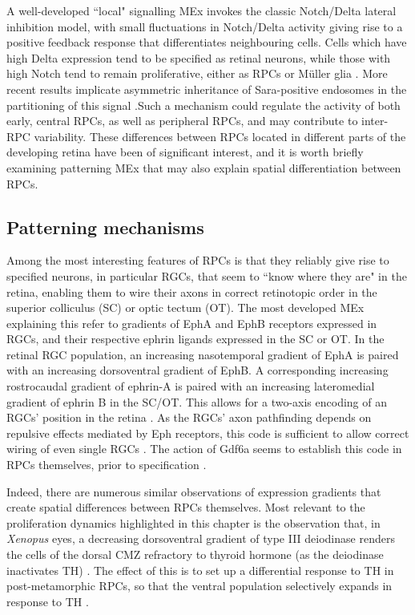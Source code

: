 A well-developed ``local" signalling MEx invokes the classic Notch/Delta lateral inhibition model, with small fluctuations in Notch/Delta activity giving rise to a positive feedback response that differentiates neighbouring cells. Cells which have high Delta expression tend to be specified as retinal neurons, while those with high Notch tend to remain proliferative, either as RPCs or M{\"u}ller glia \cite{Dorsky1995,Dorsky1997}. More recent results implicate asymmetric inheritance of Sara-positive endosomes in the partitioning of this signal \cite{Nerli2020}.Such a mechanism could regulate the activity of both early, central RPCs, as well as peripheral RPCs, and may contribute to inter-RPC variability. These differences between RPCs located in different parts of the developing retina have been of significant interest, and it is worth briefly examining patterning MEx that may also explain spatial differentiation between RPCs.

\subsection{Patterning mechanisms}

Among the most interesting features of RPCs is that they reliably give rise to specified neurons, in particular RGCs, that seem to ``know where they are" in the retina, enabling them to wire their axons in correct retinotopic order in the superior colliculus (SC) or optic tectum (OT). The most developed MEx explaining this refer to gradients of EphA and EphB receptors expressed in RGCs, and their respective ephrin ligands expressed in the SC or OT. In the retinal RGC population, an increasing nasotemporal gradient of EphA is paired with an increasing dorsoventral gradient of EphB. A corresponding increasing rostrocaudal gradient of ephrin-A is paired with an increasing lateromedial gradient of ephrin B in the SC/OT. 
This allows for a two-axis encoding of an RGCs' position in the retina \cite{Tsigankov2006}. As the RGCs' axon pathfinding depends on repulsive effects mediated by Eph receptors, this code is sufficient to allow correct wiring of even single RGCs \cite{Gosse2008}. The action of Gdf6a seems to establish this code in RPCs themselves, prior to specification \cite{French2009}.

Indeed, there are numerous similar observations of expression gradients that create spatial differences between RPCs themselves. Most relevant to the proliferation dynamics highlighted in this chapter is the observation that, in \textit{Xenopus} eyes, a decreasing dorsoventral gradient of type III deiodinase renders the cells of the dorsal CMZ refractory to thyroid hormone (as the deiodinase inactivates TH) \cite{Marsh-Armstrong1999}. The effect of this is to set up a differential response to TH in post-metamorphic RPCs, so that the ventral population selectively expands in response to TH \cite{Beach1979}. 

